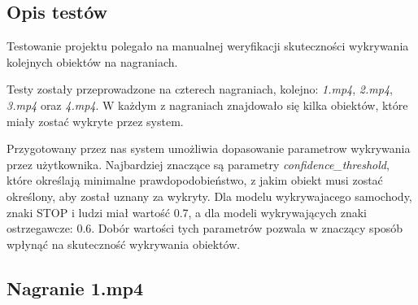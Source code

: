 \subsection{Opis testów}
Testowanie projektu polegało na manualnej weryfikacji skuteczności wykrywania kolejnych obiektów na
nagraniach.

Testy zostały przeprowadzone na czterech nagraniach, kolejno: \textit{1.mp4}, \textit{2.mp4}, \textit{3.mp4}
oraz \textit{4.mp4}.
W każdym z nagraniach znajdowało się kilka obiektów, które miały zostać wykryte przez system.
 
Przygotowany przez nas system umożliwia dopasowanie parametrow wykrywania przez użytkownika. Najbardziej
znaczące są parametry \textit{confidence_threshold}, które określają minimalne prawdopodobieństwo, z jakim
obiekt musi zostać określony, aby został uznany za wykryty. Dla modelu wykrywajacego samochody, znaki STOP i
ludzi miał wartość 0.7, a dla modeli wykrywających znaki ostrzegawcze: 0.6. Dobór wartości tych parametrów 
pozwala w znaczący sposób wpłynąć na skuteczność wykrywania obiektów.

\subsection{Nagranie 1.mp4}

